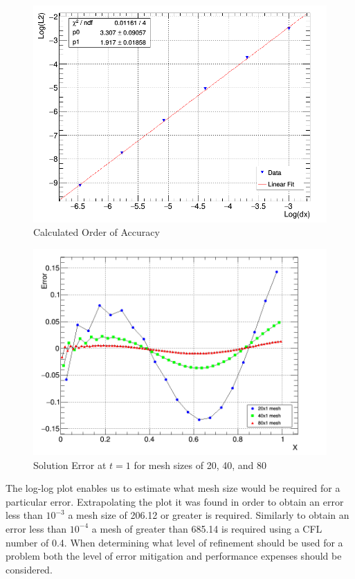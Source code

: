 \documentclass[paper=a4, fontsize=11pt, abstract=on]{scrartcl}
\numberwithin{equation}{section}		%
\numberwithin{figure}{section}			%
\numberwithin{table}{section}				%
\begin{document}
\begin{figure}[H]
\centering
\includegraphics[width=0.85\linewidth]{order}
\caption{Calculated Order of Accuracy}
\label{ord}
\end{figure}

\begin{figure}[H]
\centering
\includegraphics[width=0.85\linewidth]{qq22}
\caption{Solution Error at $t=1$ for mesh sizes of 20, 40, and 80}
\label{3D}
\end{figure}


The log-log plot enables us to estimate what mesh size would be required for a particular error. Extrapolating the plot it was found in order to obtain an error less than $10^{-3}$ a mesh size of 206.12 or greater is required. Similarly to obtain an error less than $10^{-4}$ a mesh of greater than 685.14 is required using a CFL number of 0.4. When determining what level of refinement should be used for a problem both the level of error mitigation and performance expenses should be considered.
\end{document}
